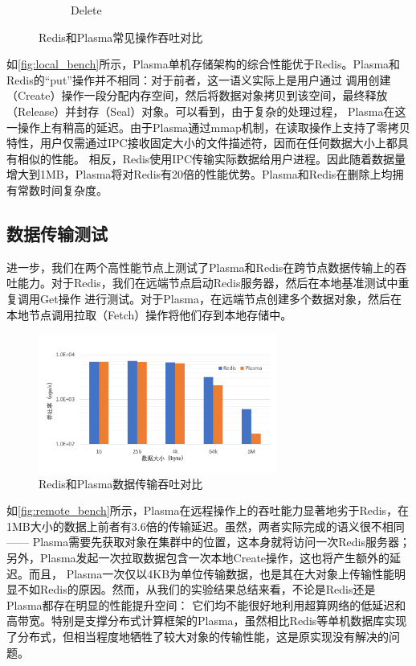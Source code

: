 \begin{figure}[h]
\begin{subfigure}{0.49\textwidth}
        \caption{Delete}
    \end{subfigure}
    \caption{Redis和Plasma常见操作吞吐对比}
    \label{fig:local_bench}
\end{figure}

如\autoref{fig:local_bench}所示，Plasma单机存储架构的综合性能优于Redis。Plasma和Redis的“put”操作并不相同：对于前者，这一语义实际上是用户通过
调用创建（Create）操作一段分配内存空间，然后将数据对象拷贝到该空间，最终释放（Release）并封存（Seal）对象。可以看到，由于复杂的处理过程，
Plasma在这一操作上有稍高的延迟。由于Plasma通过mmap机制，在读取操作上支持了零拷贝特性，用户仅需通过IPC接收固定大小的文件描述符，因而在任何数据大小上都具有相似的性能。
相反，Redis使用IPC传输实际数据给用户进程。因此随着数据量增大到1MB，Plasma将对Redis有20倍的性能优势。Plasma和Redis在删除上均拥有常数时间复杂度。

\subsection{数据传输测试}

进一步，我们在两个高性能节点上测试了Plasma和Redis在跨节点数据传输上的吞吐能力。对于Redis，我们在远端节点启动Redis服务器，然后在本地基准测试中重复调用Get操作
进行测试。对于Plasma，在远端节点创建多个数据对象，然后在本地节点调用拉取（Fetch）操作将他们存到本地存储中。

\begin{figure}[h]
    \centering
    \includegraphics[width=0.7\textwidth]{image/chap02/fetch.png}
    \caption{Redis和Plasma数据传输吞吐对比}
    \label{fig:remote_bench}
\end{figure}

如\autoref{fig:remote_bench}所示，Plasma在远程操作上的吞吐能力显著地劣于Redis，在1MB大小的数据上前者有3.6倍的传输延迟。虽然，两者实际完成的语义很不相同——
Plasma需要先获取对象在集群中的位置，这本身就将访问一次Redis服务器；另外，Plasma发起一次拉取数据包含一次本地Create操作，这也将产生额外的延迟。而且，
Plasma一次仅以4KB为单位传输数据，也是其在大对象上传输性能明显不如Redis的原因。然而，从我们的实验结果总结来看，不论是Redis还是Plasma都存在明显的性能提升空间：
它们均不能很好地利用超算网络的低延迟和高带宽。特别是支撑分布式计算框架的Plasma，虽然相比Redis等单机数据库实现了分布式，但相当程度地牺牲了较大对象的传输性能，这是原实现没有解决的问题。

